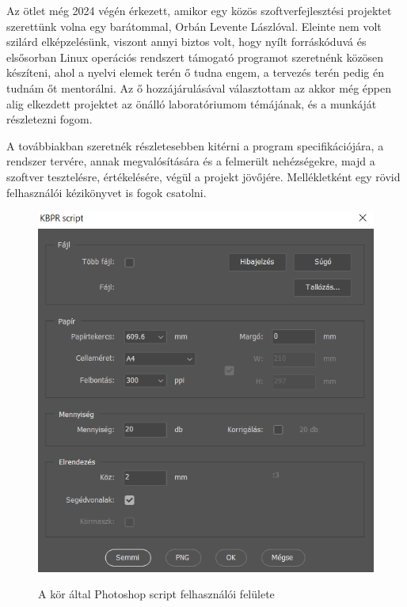 Az ötlet még 2024 végén érkezett, amikor egy közös szoftverfejlesztési projektet szerettünk volna egy barátommal, Orbán Levente Lászlóval. Eleinte nem volt szilárd elképzelésünk, viszont annyi biztos volt, hogy nyílt forráskóduvá és elsősorban Linux operációs rendszert támogató programot szeretnénk közösen készíteni, ahol a nyelvi elemek terén ő tudna engem, a tervezés terén pedig én tudnám őt mentorálni. Az ő hozzájárulásával választottam az akkor még éppen alig elkezdett projektet az önálló laboratóriumom témájának, és a munkáját részletezni fogom.

\break

A továbbiakban szeretnék részletesebben kitérni a program specifikációjára, a rendszer tervére, annak megvalósítására és a felmerült nehézségekre, majd a szoftver tesztelésre, értékelésére, végül a projekt jövőjére. Mellékletként egy rövid felhasználói kézikönyvet is fogok csatolni.

\begin{figure}[h]
    \includegraphics[width=\textwidth]{figures/script_showcase.png}
    \label{fig:old_ui}
    \caption{A kör által Photoshop script felhasználói felülete}
\end{figure}